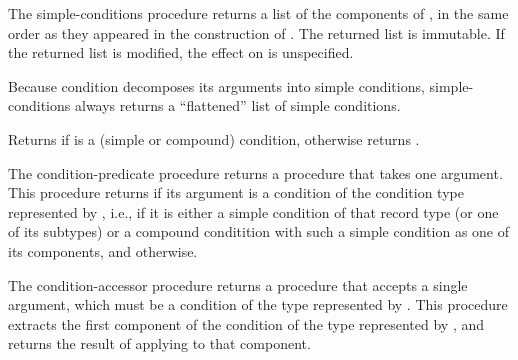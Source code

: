 \begin{entry}{%
}

The {\cf simple-conditions}
procedure returns a list of the components of , in the same
order as they appeared in the construction of .  The
returned list is immutable.  If the returned list is modified, the
effect on  is unspecified.

\begin{note}
  Because {\cf condition} decomposes its arguments into simple
  conditions, {\cf simple-conditions} always returns a ``flattened''
  list of simple conditions.
\end{note}
\end{entry}


\begin{entry}{%
}

Returns \schtrue{} if  is a (simple or compound) condition,
otherwise returns \schfalse.
\end{entry}

\begin{entry}{%
}

  The {\cf condition-predicate} procedure returns
a procedure that takes one argument.  This procedure returns
\schtrue{} if its argument is a condition of the condition type
represented by , i.e., if it is either a simple condition of
that record type (or one of its subtypes) or a compound conditition
with such a simple condition as one of its components, and \schfalse{}
otherwise.
\end{entry}

\begin{entry}{%
}

  The {\cf
  condition-accessor} procedure returns a procedure that accepts a
single argument, which must be a condition of the type represented by
.  This procedure extracts the first component of the
condition of the type represented by , and returns the result
of applying  to that component.
\end{entry}

